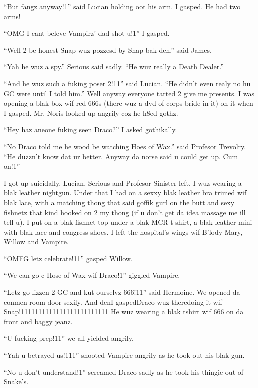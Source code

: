 \enquote{But fangz anyway!1} said Lucian holding oot his arm. I gasped. He had two arms!

\enquote{OMG I cant beleve Vampirz' dad shot u!1} I gasped.

\enquote{Well 2 be honest Snap wuz pozzesd by Snap bak den.} said James.

\enquote{Yah he wuz a spy.} Serious said sadly. \enquote{He wuz really a Death Dealer.}

\enquote{And he wuz such a fuking poser 2!11} said Lucian. \enquote{He didn't even realy no hu GC were until I told him.} Well anyway everyone tarted 2 give me presents. I was opening a blak box wif red 666s (there wuz a dvd of corps bride in it) on it when I gasped. Mr. Noris looked up angrily coz he h8ed gothz.

\enquote{Hey haz aneone fuking seen Draco?} I asked gothikally.

\enquote{No Draco told me he wood be watching Hoes of Wax.} said Profesor Trevolry. \enquote{He duzzn't know dat ur better. Anyway da norse said u could get up. Cum on!1}

I got up suicidally. Lucian, Serious and Profesor Sinister left. I wuz wearing a blak leather nightgun. Under that I had on a sexxy blak leather bra trimed wif blak lace, with a matching thong that said goffik gurl on the butt and sexy fishnetz that kind hooked on 2 my thong (if u don't get da idea massage me ill tell u). I put on a blak fishnet top under a blak MCR t-shirt, a blak leather mini with blak lace and congress shoes. I left the hospital's wings wif B'lody Mary, Willow and Vampire.

\enquote{OMFG letz celebrate!11} gasped Willow.

\enquote{We can go c Hose of Wax wif Draco!1} giggled Vampire.

\enquote{Letz go lizzen 2 GC and kut ourselvz 666!11} said Hermoine. We opened da conmen room door sexily. And den\dotfill\newline I gasped\dotfill Draco wuz there\newline doing it wif Snap!1111111111111111111111111 He wuz wearing a blak tshirt wif 666 on da front and baggy jeanz.

\enquote{U fucking prep!11} we all yielded angrily.

\enquote{Yah u betrayed us!111} shooted Vampire angrily as he took out his blak gun.

\enquote{No u don't understand!1} screamed Draco sadly as he took his thingie out of Snake's.

